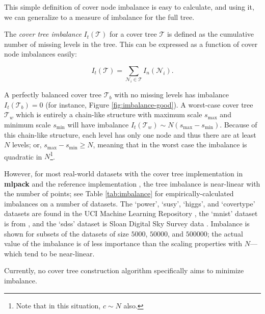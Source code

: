 This simple definition of cover node imbalance is easy to calculate, and using
it, we can generalize to a measure of imbalance for the full tree.

\begin{defn}
\label{def:imbalance}
The {\it cover tree imbalance} $I_t(\mathscr{T})$ for a cover tree $\mathscr{T}$
is defined as the cumulative number of missing levels in the tree.  This can be
expressed as a function of cover node imbalances easily:

\begin{equation}
I_t(\mathscr{T}) = \sum_{\mathscr{N}_i \in \mathscr{T}} I_n(\mathscr{N}_i).
\end{equation}
\end{defn}

A perfectly balanced cover tree $\mathscr{T}_b$ with no missing levels has
imbalance $I_t(\mathscr{T}_b) = 0$ (for instance, Figure
\ref{fig:imbalance-good}).  A worst-case cover tree $\mathscr{T}_w$ which is
entirely a chain-like structure with maximum scale $s_{\max}$ and minimum scale
$s_{\min}$ will have imbalance $I_t(\mathscr{T}_w) \sim N (s_{\max} -
s_{\min})$.  Because of this chain-like structure, each level has only one node
and thus there are at least $N$ levels; or, $s_{\max} - s_{\min} \ge N$, meaning
that in the worst case the imbalance is quadratic in $N$\footnote{Note that in
this situation, $c \sim N$ also.}.

However, for most real-world datasets with the cover tree implementation in {\bf
mlpack} \citep{mlpack2013} and the reference implementation
\citep{langford2006}, the tree imbalance is near-linear with the number of
points; see Table \ref{tab:imbalance} for empirically-calculated imbalances
on a number of datasets.  The `power', `susy', `higgs', and
`covertype' datasets are found in the UCI Machine Learning Repository
\cite{ucimlrepository}, the `mnist' dataset is from \cite{lecun2000mnist}, and
the `sdss' dataset is Sloan Digital Sky Survey data \cite{adelman2008sixth}.
Imbalance is shown for subsets of the datasets of size $5000$, $50000$, and
$500000$; the actual value of the imbalance is of less importance than the
scaling properties with $N$---which tend to be near-linear.

Currently, no cover tree construction algorithm specifically aims to minimize
imbalance.

